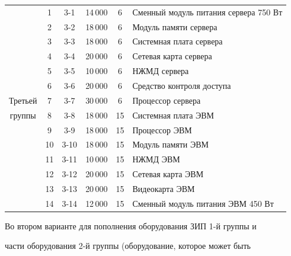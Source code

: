 \begin{table}
\begin{center}
\begin{tabular}{|c|c|c|c|c|l|}
 &1&3-1&14\,000&\hphantom{9}6&Сменный модуль питания сервера 750 Вт \\

&2&3-2&18\,000&\hphantom{9}6&Модуль памяти сервера\\

&3&3-3&18\,000&\hphantom{9}6&Системная плата сервера\\

&4&3-4&20\,000&\hphantom{9}6&Сетевая карта сервера\\

&5&3-5&10\,000&\hphantom{9}6&НЖМД сервера\\

&6&3-6&20\,000&\hphantom{9}6&Средство контроля доступа\\

Третьей&7&3-7&30\,000&\hphantom{9}6&Процессор сервера\\

группы&8&3-8&18\,000&15&Системная плата ЭВМ\\

&9&3-9&18\,000&15&Процессор ЭВМ\\

&10\hphantom{9}&\hphantom{9}3-10&18\,000&15&Модуль памяти ЭВМ\\

&11\hphantom{9}&\hphantom{9}3-11&10\,000&15&НЖМД ЭВМ\\

&12\hphantom{9}&\hphantom{9}3-12&20\,000&15&Сетевая карта ЭВМ\\

&13\hphantom{9}&\hphantom{9}3-13&20\,000&15&Видеокарта ЭВМ\\

&14\hphantom{9}&\hphantom{9}3-14&12\,000&15&Сменный модуль питания ЭВМ 450 Вт\\

\hline

\end{tabular}

\end{center}

\vspace*{-10pt}

\end{table}





     Во втором варианте для пополнения оборудования ЗИП 1-й группы и

части оборудования 2-й группы (оборудование, которое может быть

